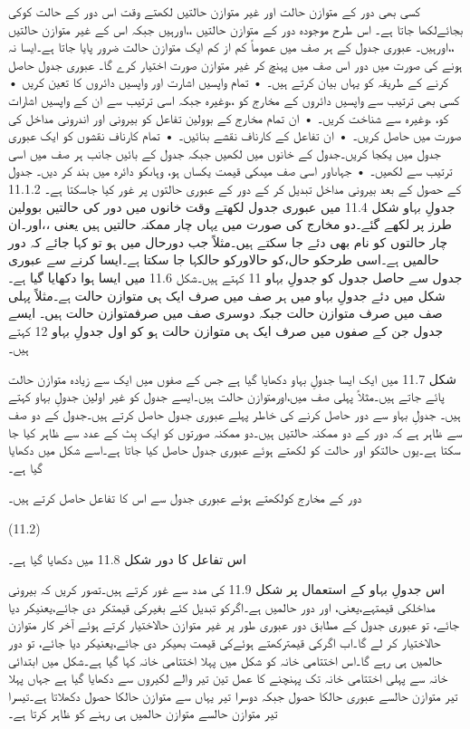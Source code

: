 	کسی بھی دور کے متوازن حالت اور غیر متوازن حالتیں لکھتے وقت اس دور کے حالت کوکی بجائےلکھا جاتا ہے۔ اس طرح موجودہ دور کے متوازن حالتیں ،،اورہیں جبکہ اس کے غیر متوازن حالتیں ،،اورہیں۔
	عبوری جدول کے ہر صف میں عموماً کم از کم ایک متوازن حالت ضرور پایا جاتا ہے۔ایسا نہ ہونے کی صورت میں دور اس صف میں پہنچ کر غیر متوازن صورت اختیار کرے گا۔
	عبوری جدول حاصل کرنے کے طریقہ کو یہاں بیان کرتے ہیں۔
    • تمام واپسیں اشارت اور واپسیں دائروں کا تعین کریں
    • کسی بھی ترتیب سے واپسیں دائروں کے مخارج کو ،،وغیرہ جبکہ اسی ترتیب سے ان کے واپسیں اشارات کو، ،وغیرہ سے شناخت کریں۔
    • ان تمام مخارج کے بوولین تفاعل کو بیرونی اور اندرونی مداخل کی صورت میں حاصل کریں۔
    • ان تفاعل کے کارناف نقشے بنائیں۔
    • تمام کارناف نقشوں کو ایک عبوری جدول میں یکجا کریں۔جدول کے خانوں میں  لکھیں جبکہ جدول کے بائیں جانب ہر صف میں اسی ترتیب سے لکھیں۔
    • جہاںاور اسی صف میںکی قیمت یکساں ہو، وہاںکو دائرہ میں بند کر دیں۔
جدول کے حصول کے بعد بیرونی مداخل تبدیل کر کے دور کے عبوری حالتوں پر غور کیا جاسکتا ہے۔ 
11.1.2 جدولِ بہاو
	شکل 11.4 میں عبوری جدول لکھتے وقت خانوں میں دور کی حالتیں بوولین طرز پر لکھے گئے۔دو مخارج کی صورت میں یہاں چار ممکنہ حالتیں ہیں یعنی ،،اور۔ان چار حالتوں کو نام بھی دئے جا سکتے ہیں۔مثلاً جب دورحال میں ہو تو کہا جائے کہ دور حالمیں ہے۔اسی طرحکو حال،کو حالاورکو حالکہا جا سکتا ہے۔ایسا کرنے سے عبوری جدول سے حاصل جدول کو جدولِ بہاو 11 کہتے ہیں۔شکل 11.6 میں ایسا ہوا دکھایا گیا ہے۔
	شکل میں دئے جدولِ بہاو میں ہر صف میں صرف ایک ہی متوازن حالت ہے۔مثلاً پہلی صف میں صرف متوازن حالت جبکہ دوسری صف میں صرفمتوازن حالت ہیں۔ ایسے جدول جن کے صفوں میں صرف ایک ہی متوازن حالت ہو کو اول جدولِ بہاو 12 کہتے ہیں۔

	شکل 11.7 میں ایک ایسا جدولِ بہاو دکھایا گیا ہے جس کے صفوں میں ایک سے زیادہ متوازن حالت پائے جاتے ہیں۔مثلاً پہلی صف میں،اورمتوازن حالت ہیں۔ایسے جدول کو غیر اولین جدولِ بہاو کہتے ہیں۔
	 جدولِ بہاو سے دور حاصل کرنے کی خاطر پہلے عبوری جدول حاصل کرتے ہیں۔جدول کے دو صف سے ظاہر ہے کہ دور کے دو ممکنہ حالتیں ہیں۔دو ممکنہ صورتوں کو ایک بِٹ کے عدد سے ظاہر کیا جا سکتا ہے۔یوں حالتکو اور حالت کو لکھتے ہوئے عبوری جدول حاصل کیا جاتا ہے۔اسے شکل میں دکھایا گیا ہے۔

	دور کے مخارج کولکھتے ہوئے عبوری جدول سے اس کا تفاعل حاصل کرتے ہیں۔

 
(11.2)

اس تفاعل کا دور شکل 11.8 میں دکھایا گیا ہے۔


	 اس جدولِ بہاو کے استعمال پر شکل 11.9 کی مدد سے غور کرتے ہیں۔تصور کریں کہ بیرونی مداخلکی قیمتہے،یعنی،  اور دور حالمیں ہے۔اگرکو تبدیل کئے بغیرکی قیمتکر دی جائے،یعنیکر دیا جائے، تو عبوری جدول کے مطابق دور  عبوری طور پر غیر متوازن حالاختیار کرتے ہوئے آخر کار متوازن حالاختیار کر لے  گا۔اب اگرکی قیمترکھتے ہوئےکی قیمت بھیکر دی جائے،یعنیکر دیا جائے، تو دور حالمیں ہی رہے گا۔اس اختتامی خانہ کو شکل میں پہلا اختتامی خانہ کہا گیا ہے۔شکل میں ابتدائی خانہ سے پہلی اختتامی خانہ تک پہنچنے کا عمل تین تیر والے لکیروں سے دکھایا گیا ہے جہاں پہلا تیر  متوازن حالسے عبوری حالکا حصول جبکہ دوسرا تیر یہاں سے متوازن حالکا حصول دکھلاتا ہے۔تیسرا تیر متوازن حالسے متوازن حالمیں ہی رہنے کو ظاہر کرتا ہے۔


